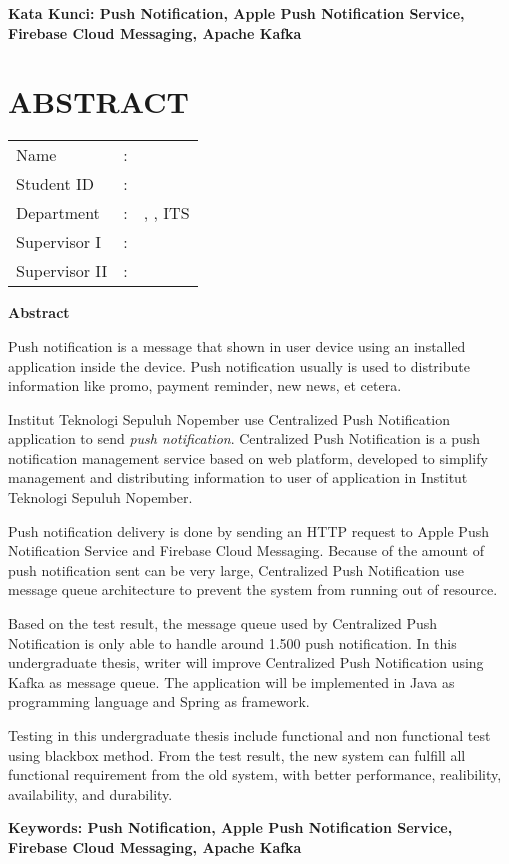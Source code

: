 \vspace*{1em}
\noindent\bfseries Kata Kunci: Push Notification, Apple Push Notification Service, Firebase Cloud Messaging, Apache Kafka
\normalfont
\cleardoublepage

\chapter {ABSTRACT}
\begin{center}
	\noindent\textbf{\MakeUppercase\juduleng}
\end{center}
\vspace*{1em}

\begin{tabularx}{\linewidth}{ l l X }
	Name 			& : & \penulis \\
	Student ID		& :	& \nrp \\
	Department 		& : & \jurusaneng, \newline \fakultaseng, ITS \\
	Supervisor I 	& : & \pembimbingsatu \\
	Supervisor II 	& : & \pembimbingdua
	\vspace*{1em} 	%
\end {tabularx}
	
\noindent\textbf{Abstract} \\
\itshape
\par Push notification is a message that shown in user device using an installed application inside the device. Push notification usually is used to distribute information like promo, payment reminder, new news, et cetera.
\par Institut Teknologi Sepuluh Nopember use Centralized Push Notification application to send \textit{push notification}. Centralized Push Notification is a push notification management service based on web platform, developed to simplify management and distributing information to user of application in Institut Teknologi Sepuluh Nopember.
\par Push notification delivery is done by sending an HTTP request to Apple Push Notification Service and Firebase Cloud Messaging. Because of the amount of push notification sent can be very large, Centralized Push Notification use message queue architecture to prevent the system from running out of resource.
\par Based on the test result, the message queue used by Centralized Push Notification is only able to handle around 1.500 push notification. In this undergraduate thesis, writer will improve Centralized Push Notification using Kafka as message queue. The application will be implemented in Java as programming language and Spring as framework.
\par Testing in this undergraduate thesis include functional and non functional test using blackbox method. From the test result, the new system can fulfill all functional requirement from the old system, with better performance, realibility, availability, and durability.

\vspace*{1em}
\noindent\bfseries Keywords: Push Notification, Apple Push Notification Service, Firebase Cloud Messaging, Apache Kafka
\normalfont
\cleardoublepage